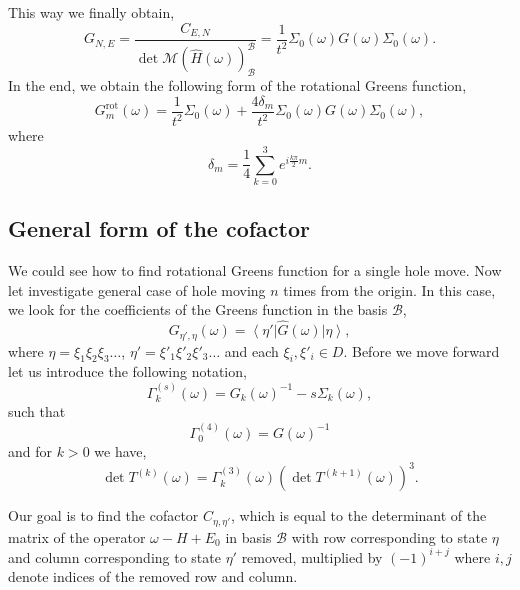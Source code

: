 \documentclass{article}
\newcommand{\ket}[1]{\left\vert #1 \right\rangle}
\newcommand{\bra}[1]{\left\langle #1 \right\vert}
\begin{document}
This way we finally obtain,
\begin{equation}
    G_{N,E} = \frac{C_{E,N}}
        {\det \mathcal{M}(\hat{H}(\omega))_\mathcal{B}^\mathcal{B}} =
    \frac{1}{t^2} 
        \Sigma_0(\omega)G(\omega)\Sigma_0(\omega).
\end{equation}
In the end, we obtain the following form of the rotational Greens function,
\begin{equation}
    G^{\text{rot}}_{m}(\omega) = \frac{1}{t^2}
        \Sigma_0(\omega) + 
        \frac{4\delta_{m}}{t^2}
        \Sigma_0(\omega)G(\omega)\Sigma_0(\omega),
\end{equation}
where
\begin{equation}
    \delta_{m} = \frac{1}{4} \sum_{k=0}^{3} e^{i \frac{k\pi}{2} m}.
\end{equation}

\subsection{General form of the cofactor}
We could see how to find rotational Greens function for a single hole move. Now let investigate general case of hole moving $n$ times from the origin. In this case, we look for the coefficients of the Greens function in the basis $\mathcal{B}$, 
\begin{equation}
    G_{\eta', \eta}(\omega) = \bra{\eta'}\hat{G}(\omega)\ket{\eta},
\end{equation}
where $\eta = \xi_1 \xi_2 \xi_3 \hdots$, $\eta' = \xi'_1 \xi'_2 \xi'_3 \hdots$ and each $\xi_i, \xi'_i \in D$. Before we move forward let us introduce the following notation,
\begin{equation}
    \Gamma_k^{(s)}(\omega) = G_{k}(\omega)^{-1} - s\Sigma_{k}(\omega),
\end{equation}
such that 
\begin{equation}
    \Gamma_0^{(4)}(\omega) = G(\omega)^{-1}
\end{equation}
and for $k > 0$ we have,
\begin{equation}
    \det T^{(k)}(\omega) = 
        \Gamma_k^{(3)}(\omega) 
        \left(\det T^{(k+1)}(\omega) \right)^3.
        \label{eq:det_recursive_gamma}
\end{equation}


Our goal is to find the cofactor $C_{\eta, \eta'}$, which is equal to the determinant of the matrix of the operator $\omega - H + E_0$ in basis $\mathcal{B}$ with row corresponding to state $\eta$ and column corresponding to state $\eta'$ removed, multiplied by $(-1)^{i+j}$ where $i,j$ denote indices of the removed row and column.
\end{document}
